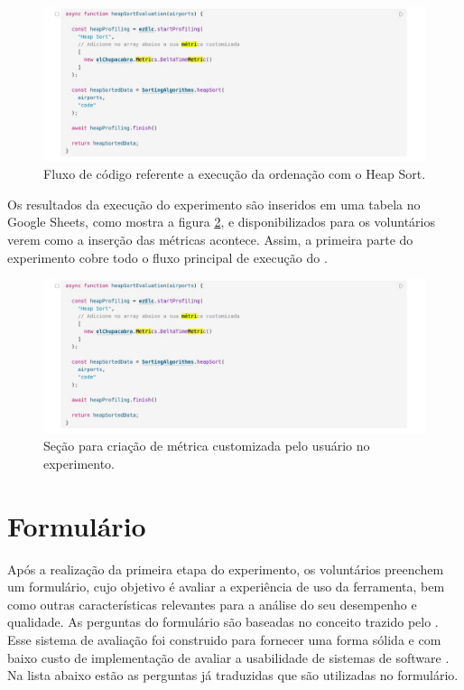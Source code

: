 \documentclass[12pt]{tcc}
\begin{document}
\begin{figure}[!ht]
	\centering
	\includegraphics[width=1\textwidth]{figures/experimento-heap.jpeg}
	\caption{Fluxo de código referente a execução da ordenação com o Heap Sort.}
	\label{fig:experimento-heap}
\end{figure}


Os resultados da execução do experimento são inseridos em uma tabela no Google Sheets, como mostra a figura \ref{fig:experimento-tabela-resultado}, e disponibilizados para os voluntários verem como a inserção das métricas acontece. Assim, a primeira parte do experimento cobre todo o fluxo principal de execução do .

\begin{figure}[!ht]
	\centering
	\includegraphics[width=1\textwidth]{figures/experimento-heap.jpeg}
	\caption{Seção para criação de métrica customizada pelo usuário no experimento.}
	\label{fig:experimento-tabela-resultado}
\end{figure}


\section{Formulário}
\label{section:parte-2-formulario}

Após a realização da primeira etapa do experimento, os voluntários preenchem um formulário, cujo objetivo é avaliar a experiência de uso da ferramenta, bem como outras características relevantes para a análise do seu desempenho e qualidade. As perguntas do formulário são baseadas no conceito trazido pelo . Esse sistema de avaliação foi construido para fornecer uma forma sólida e com baixo custo de implementação de avaliar a usabilidade de sistemas de software \citep{brooke1995sus}. Na lista abaixo estão as perguntas já traduzidas que são utilizadas no formulário.
\end{document}
